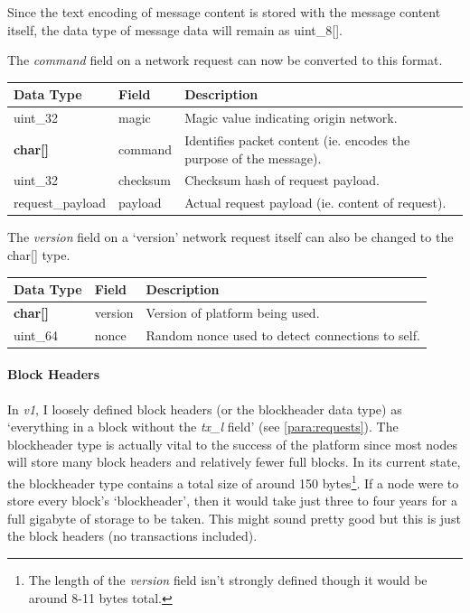 \documentclass{article}
\begin{document}
Since the text encoding of message content is stored with the message content itself, the data type of message data will remain as uint\_8[\hspace{0.05cm}].

The \textit{command} field on a network request can now be converted to this format.
\begin{table}[H]
\centering
\begin{tabular}{|p{2.5cm}|p{2cm}|p{5.5cm}|}
\hline
\rowcolor{tblgrey} 
Data Type   & Field       & Description                                      \\ \hline
uint\_32    & magic       & Magic value indicating origin network.           \\ \hline
\textbf{char[\hspace{0.05cm}]} & command & Identifies packet content (ie. encodes the purpose of the message). \\ \hline
uint\_32    & checksum    & Checksum hash of request payload.                \\ \hline
request\_payload & payload     & Actual request payload (ie. content of request). \\ \hline
\end{tabular}
\end{table}

The \textit{version} field on a `version' network request itself can also be changed to the char[\hspace{0.05cm}] type.
\begin{table}[H]
\centering
\begin{tabular}{|p{1.3cm}|p{2.5cm}|p{5.5cm}|}
\hline
\rowcolor{tblgrey}
Data Type   & Field       & Description     \\ \hline
\textbf{char[\hspace{0.05cm}]} & version     & Version of platform being used.                          \\ \hline
uint\_64    & nonce       & Random nonce used to detect connections to self.                   \\ \hline
\end{tabular}
\end{table}

\newpage

\paragraph{Block Headers} \label{para:headers}
In \textit{v1}, I loosely defined block headers (or the blockheader data type) as `everything in a block without the \textit{tx\_l} field' (see \autoref{para:requests}). The blockheader type is actually vital to the success of the platform since most nodes will store many block headers and relatively fewer full blocks. In its current state, the blockheader type contains a total size of around 150 bytes\footnote{The length of the \textit{version} field isn't strongly defined though it would be around 8-11 bytes total.}. If a node were to store every block's `blockheader', then it would take just three to four years for a full gigabyte of storage to be taken. This might sound pretty good but this is just the block headers (no transactions included).
\end{document}
